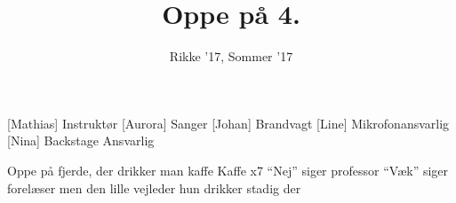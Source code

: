 \documentclass[a4paper,11pt]{article}
\title{Oppe på 4.}
\author{Rikke '17, Sommer '17}
\begin{document}
\maketitle

\begin{roles}
[Mathias] Instruktør
[Aurora] Sanger
[Johan] Brandvagt
[Line] Mikrofonansvarlig
[Nina] Backstage Ansvarlig
\end{roles}

\begin{song}
   Oppe på fjerde, der drikker man kaffe
Kaffe x7
“Nej” siger professor
“Væk” siger forelæser
men den lille vejleder hun drikker stadig der

\end{song}
\end{document}

